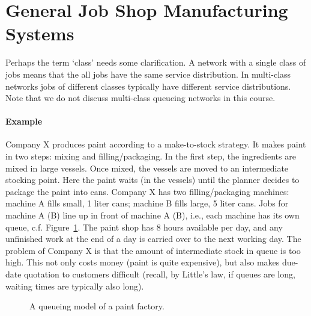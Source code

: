 

\section{General Job Shop Manufacturing Systems}
\label{sec:general-job-shop}

Perhaps the term `class' needs some clarification. A network with a
single class of jobs means that the all jobs have the same service
distribution. In multi-class networks jobs of different classes
typically have different service distributions. Note that we do not
discuss multi-class queueing networks in this course.


\paragraph{Example}

Company X produces paint according to a make-to-stock strategy. It
makes paint in two steps: mixing and filling/packaging. In the first
step, the ingredients are mixed in large vessels. Once mixed, the
vessels are moved to an intermediate stocking point. Here the paint
waits (in the vessels) until the planner decides to package the paint
into cans. Company X has two filling/packaging machines: machine A
fills small, 1 liter cans; machine B fills large, 5 liter cans. Jobs
for machine A (B) line up in front of machine A (B), i.e., each
machine has its own queue, c.f. Figure~\ref{fig:paint}. The paint shop
has 8 hours available per day, and any unfinished work at the end of a
day is carried over to the next working day. The problem of Company X
is that the amount of intermediate stock in queue is too high. This
not only costs money (paint is quite expensive), but also makes
due-date quotation to customers difficult (recall, by Little's law, if
queues are long, waiting times are typically also long).


\begin{figure}[ht]
    \centering
\caption{A queueing model of a paint factory.}
\label{fig:paint}
\end{figure}

